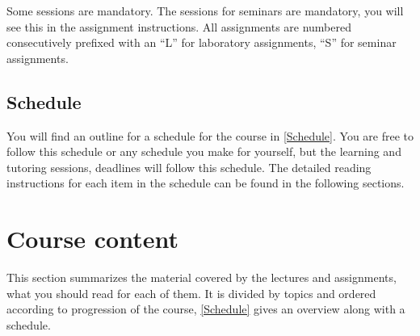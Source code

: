 Some sessions are mandatory.
The sessions for seminars are mandatory, you will see this in the assignment 
instructions.
All assignments are numbered consecutively prefixed with an \enquote{L} for 
laboratory assignments, \enquote{S} for seminar assignments.

\subsection{Schedule}

You will find an outline for a schedule for the course in \cref{Schedule}.
You are free to follow this schedule or any schedule you make for yourself, but 
the learning and tutoring sessions, deadlines \etc will follow this schedule.
The detailed reading instructions for each item in the schedule can be found in 
the following sections.

\begin{frame}[allowframebreaks]

\end{frame}


\section<article>{Course content}

This section summarizes the material covered by the lectures and assignments, 
\ie what you should read for each of them.
It is divided by topics and ordered according to progression of the course, 
\cref{Schedule} gives an overview along with a schedule.

